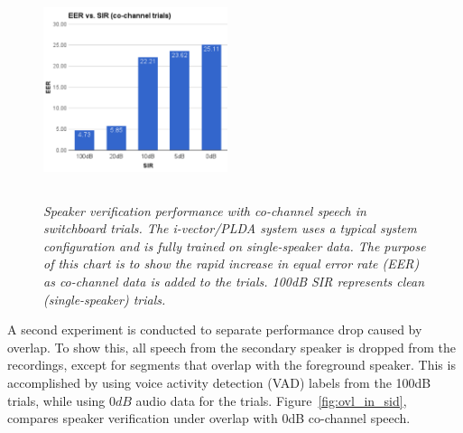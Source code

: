 \documentclass[journal]{IEEEtran}
\begin{document}
\begin{figure}[h!]
	\vspace{-1mm}
	\includegraphics[height = 2.5in, width=0.48\textwidth]{figures/eer_vs_sir_swb2_baseline}
	\vspace{-2mm}
	\caption{\it \small Speaker verification performance with co-channel speech in switchboard trials. The i-vector/PLDA system uses a typical system configuration and is fully trained on single-speaker data. The purpose of this chart is to show the rapid increase in equal error rate (EER) as co-channel data is added to the trials. 100dB SIR represents clean (single-speaker) trials.}
	\label{fig:cch_in_sid}
	\vspace{-1mm}
\end{figure}


A second experiment is conducted to separate performance drop caused by overlap. To show this, all speech from the secondary speaker is dropped from the recordings, except for segments that overlap with the foreground speaker. 
This is accomplished by using voice activity detection (VAD) labels from the 100dB trials, while using $0dB$ audio data for the trials. 
Figure~\ref{fig:ovl_in_sid}, compares speaker verification under overlap with 0dB co-channel speech. 
\end{document}
